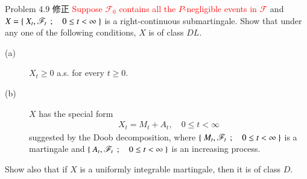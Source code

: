	\begin{itembox}[l]{Problem 4.9 修正}
		\textcolor{red}{Suppose $\mathscr{F}_0$ contains all the $P$-negligible events in $\mathscr{F}$} and
		$X = \left\{\ X_t,\mathscr{F}_t\ \, ; \quad 0 \leq t < \infty\ \right\}$ is a right-continuous submartingale.
		Show that under any one of the following conditions, $X$ is of class $DL$.
		\begin{description}
			\item[(a)] $X_t \geq 0$ a.s. for every $t \geq 0$.
			\item[(b)] $X$ has the special form
				\begin{align}
					X_t = M_t + A_t, \quad 0 \leq t < \infty
				\end{align}
				suggested by the Doob decomposition, where $\left\{\ M_t,\mathscr{F}_t\ \, ; \quad 0 \leq t < \infty\ \right\}$
				is a martingale and $\left\{\ A_t,\mathscr{F}_t\ \, ; \quad 0 \leq t < \infty\ \right\}$ is an increasing process.
		\end{description}
		Show also that if $X$ is a uniformly integrable martingale, then it is of class $D$.
	\end{itembox}
	
